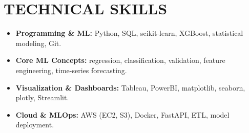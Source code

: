 \documentclass[a4paper,9pt]{extarticle}
\begin{document}
\section*{TECHNICAL SKILLS}

\begin{itemize}[leftmargin=0.5cm, label={}]
\item \textbf{Programming \& ML:} Python, SQL, scikit-learn, XGBoost, statistical modeling, Git. \\

\item \textbf{Core ML Concepts:} regression, classification, validation, feature engineering, time-series forecasting. \\

\item \textbf{Visualization \& Dashboards:} Tableau, PowerBI, matplotlib, seaborn, plotly, Streamlit. \\

\item \textbf{Cloud \& MLOps:} AWS (EC2, S3), Docker, FastAPI, ETL, model deployment. \\
\end{itemize}
\end{document}

